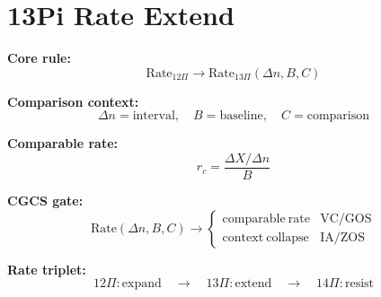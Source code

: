 \section*{13Pi Rate Extend}

\textbf{Core rule:}
\[
\mathrm{Rate}_{12\Pi}
\rightarrow
\mathrm{Rate}_{13\Pi}(\Delta n, B, C)
\]

\textbf{Comparison context:}
\[
\Delta n = \mathrm{interval}, \quad B = \mathrm{baseline}, \quad C = \mathrm{comparison}
\]

\textbf{Comparable rate:}
\[
r_c = \frac{\Delta X / \Delta n}{B}
\]

\textbf{CGCS gate:}
\[
\mathrm{Rate}(\Delta n,B,C) \rightarrow
\begin{cases}
\mathrm{comparable\ rate} & \text{VC/GOS} \\
\mathrm{context\ collapse} & \text{IA/ZOS}
\end{cases}
\]

\textbf{Rate triplet:}
\[
12\Pi:\mathrm{expand}
\quad\rightarrow\quad
13\Pi:\mathrm{extend}
\quad\rightarrow\quad
14\Pi:\mathrm{resist}
\]
